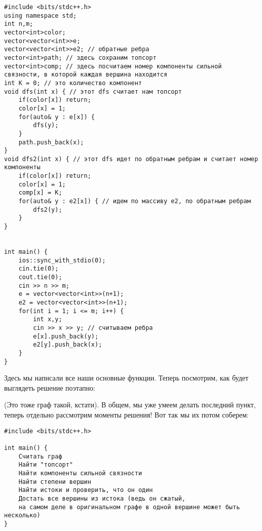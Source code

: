 \documentclass{article}
\begin{document}
\begin{verbatim}
#include <bits/stdc++.h>
using namespace std;
int n,m;
vector<int>color;
vector<vector<int>>e; 
vector<vector<int>>e2; // обратные ребра
vector<int>path; // здесь сохраним топсорт
vector<int>comp; // здесь посчитаем номер компоненты сильной связности, в которой каждая вершина находится
int K = 0; // это количество компонент
void dfs(int x) { // этот dfs считает нам топсорт
    if(color[x]) return;
    color[x] = 1;
    for(auto& y : e[x]) {
        dfs(y);
    }
    path.push_back(x);
}
void dfs2(int x) { // этот dfs идет по обратным ребрам и считает номер компоненты
    if(color[x]) return;
    color[x] = 1;
    comp[x] = K;
    for(auto& y : e2[x]) { // идем по массиву e2, по обратным ребрам
        dfs2(y);
    }
}


int main() {
    ios::sync_with_stdio(0);
    cin.tie(0);
    cout.tie(0);
    cin >> n >> m;
    e = vector<vector<int>>(n+1);
    e2 = vector<vector<int>>(n+1);
    for(int i = 1; i <= m; i++) {
        int x,y;
        cin >> x >> y; // считываем ребра
        e[x].push_back(y);
        e2[y].push_back(x);
    }
}
\end{verbatim}
Здесь мы написали все наши основные функции. Теперь посмотрим, как будет выглядеть решение поэтапно:

\begin{center}
    \end{center}
(Это тоже граф такой, кстати). В общем, мы уже умеем делать последний пункт, теперь отдельно рассмотрим моменты решения!
Вот так мы их потом соберем:
\begin{verbatim}
#include <bits/stdc++.h>

int main() {
    Считать граф
    Найти "топсорт"
    Найти компоненты сильной связности
    Найти степени вершин
    Найти истоки и проверить, что он один
    Достать все вершины из истока (ведь он сжатый, 
    на самом деле в оригинальном графе в одной вершине может быть несколько)
}
\end{verbatim}
\end{document}
